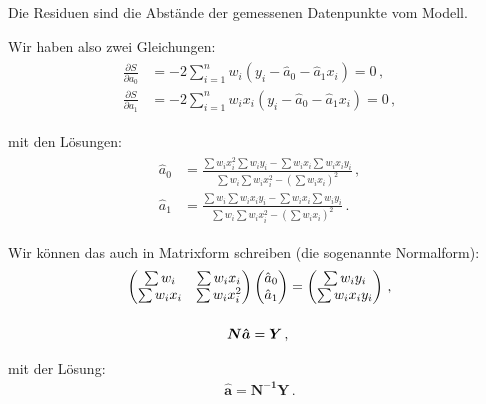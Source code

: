 \begin{center}
\begin{tcolorbox}[enhanced,width=6in,drop fuzzy shadow southwest,
    colframe=red!50!black,colback=red!05]
   Die Residuen sind die Abst\"ande der gemessenen Datenpunkte vom Modell.
\end{tcolorbox}
\end{center}

Wir haben also zwei Gleichungen:
\begin{align}
\begin{split}
\frac{ \partial S }{ \partial a_0 } &= - 2 \sum_{i = 1}^n w_i (y_i - \hat{a}_0 - \hat{a}_1 x_i) = 0\,,\\
\frac{ \partial S }{ \partial a_1 } &= - 2 \sum_{i = 1}^n w_i x_i (y_i - \hat{a}_0 - \hat{a}_1 x_i) = 0\,,
\label{eq:vl8-25}
\end{split}
\end{align}

mit den L\"osungen:
\begin{align}
\begin{split}
\hat{a}_0 &= \frac{ \sum w_i x_i^2 \sum w_i y_i - \sum w_i x_i \sum w_i x_i y_i }{ \sum w_i \sum w_i x_i^2 - (\sum w_i x_i)^2 }\,,\\
\hat{a}_1 &= \frac{ \sum w_i \sum w_i x_i y_i - \sum w_i x_i \sum w_i y_i }{ \sum w_i \sum w_i x_i^2 - (\sum w_i x_i)^2 }\,.
\label{eq:vl8-26}
\end{split}
\end{align}

Wir k\"onnen das auch in Matrixform schreiben (die sogenannte Normalform):
\begin{align}
\begin{pmatrix}
\sum w_i     & \sum w_i x_i   \\
\sum w_i x_i & \sum w_i x_i^2
\end{pmatrix}
\begin{pmatrix}
\hat{a}_0 \\
\hat{a}_1
\end{pmatrix}
&= 
\begin{pmatrix}
\sum w_i y_i \\
\sum w_i x_i y_i
\end{pmatrix}\,,\\
\intertext{}
\boldsymbol{N \hat{a}} = \boldsymbol{Y}\,,
\label{eq:vl8-28}
\end{align}

mit der L\"osung:
\begin{align}
\boldsymbol{\hat{a}} = \boldsymbol{N^{-1} Y}\,.    
\label{eq:vl8-28-2}
\end{align}

